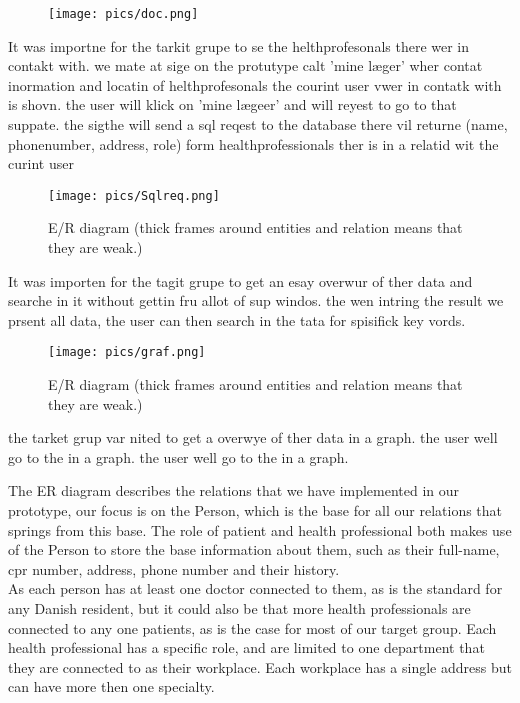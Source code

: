 \documentclass[a4paper,11pt]{article}
\begin{document}
\begin{figure}[H]
    \centering
    \texttt{[image: pics/doc.png]}
    \caption{}
    \label{fig:er}
\end{figure}

It was importne for the tarkit grupe to se the helthprofesonals there wer in contakt with. we mate at sige on the protutype calt 'mine læger' wher contat inormation and locatin of helthprofesonals the courint user vwer in contatk with is shovn. the user will klick on 'mine lægeer' and will reyest to go to that suppate. the sigthe will send a sql reqest to the database there vil returne (name, phonenumber, address, role)  form healthprofessionals ther is in a relatid wit the curint user

\begin{figure}[H]
    \centering
    \texttt{[image: pics/Sqlreq.png]}
    \caption{E/R diagram (thick frames around entities and relation means that they are weak.)}
    \label{fig:er}
\end{figure}

It was importen for the tagit grupe to get an esay overwur of ther data and searche in it without gettin fru allot of sup windos. the wen intring the result we prsent all data, the user can then search in the tata for spisifick key vords.

\begin{figure}[H]
    \centering
    \texttt{[image: pics/graf.png]}
    \caption{E/R diagram (thick frames around entities and relation means that they are weak.)}
    \label{fig:er}
\end{figure}
the tarket grup var nited to get a overwye of ther data in a graph. the user well go to the in a graph. the user well go to the in a graph.


The ER diagram describes the relations that we have implemented in our prototype, our focus is on the Person, which is the base for all our relations that springs from this base. The role of patient and health professional both makes use of the Person to store the base information about them, such as their full-name, cpr number, address, phone number and their history.\\

As each person has at least one doctor connected to them, as is the standard for any Danish resident, but it could also be that more health professionals are connected to any one patients, as is the case for most of our target group. Each health professional has a specific role, and are limited to one department that they are connected to as their workplace. Each workplace has a single address but can have more then one specialty.\\
\end{document}
